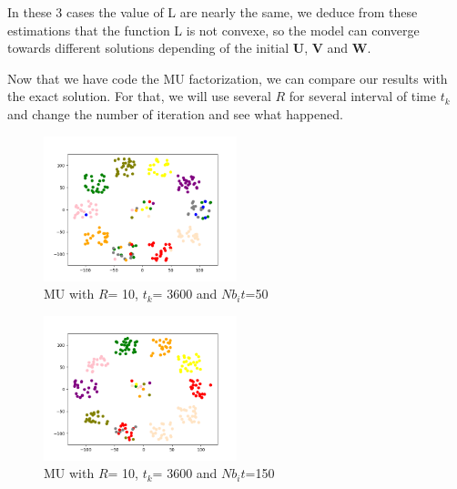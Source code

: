 \documentclass{article}
\begin{document}
In these 3 cases the value of L are nearly the same, we deduce from these estimations that the function L is not convexe, so the model can converge 
towards different solutions depending of the initial $\mathbf{U}$, $\mathbf{V}$ and $\mathbf{W}$.























Now that we have code the MU factorization, we can compare our results with the exact solution. 
For that, we will use several $R$ for several interval of time $t_{k}$ and change the number of iteration and see what happened. \\

\begin{figure}[h]
    \centering
    \includegraphics[width=0.5\textwidth]{images/MU50_R10_t3600.png}
    \caption{MU with $R$= 10, $t_{k}$= 3600 and $Nb_it$=50}
\end{figure}

\begin{figure}[h]
    \centering
    \includegraphics[width=0.5\textwidth]{images/MU150_R10_t3600.png}
    \caption{MU with $R$= 10, $t_{k}$= 3600 and $Nb_it$=150}
\end{figure}
\end{document}
